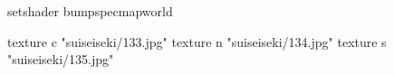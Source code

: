 setshader bumpspecmapworld

    texture c "suiseiseki/133.jpg"
    texture n "suiseiseki/134.jpg"
    texture s "suiseiseki/135.jpg"
